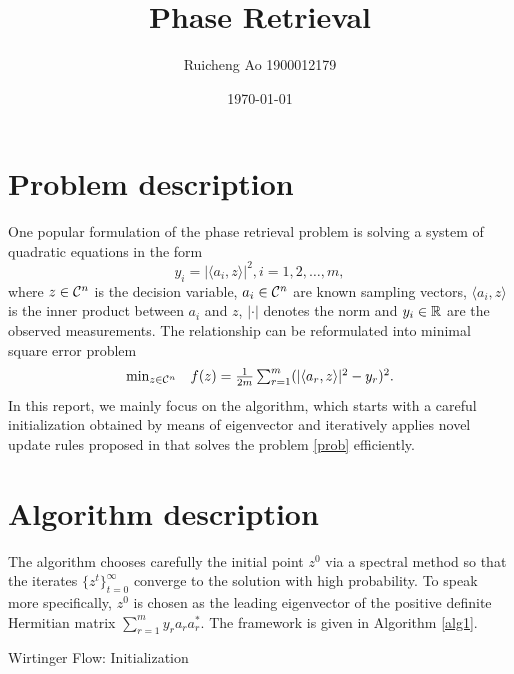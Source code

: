 \documentclass{article}
\title{Phase Retrieval}
\date{\today}
\author{Ruicheng Ao 1900012179}
\begin{document}
\maketitle
\section{Problem description}
One popular formulation of the phase retrieval problem is solving a system of quadratic equations in the form
\begin{equation}
	y_i = |\langle a_i,z\rangle|^2,i=1,2,\dots,m,
\end{equation}
where $z\in\mathcal C^n$ is the decision variable, $a_i\in\mathcal C^n$ are known sampling vectors, $\langle a_i,z\rangle$ is the inner product between $a_i$ and $z$, $|\cdot|$ denotes the norm and $y_i\in\mathbb R$ are the observed measurements. The relationship can be reformulated into minimal square error problem 
\begin{equation}\label{prob}
	\begin{array}{cc}
		\min_{z\in\mathcal C^n} & f(z)=\frac{1}{2m}\sum_{r=1}^m(|\langle a_r,z\rangle|^2-y_r)^2.
	\end{array}
\end{equation}
In this report, we mainly focus on the algorithm, which starts with a careful initialization obtained by means of eigenvector and iteratively applies novel update rules proposed in \cite{candes2015phase} that solves the problem \eqref{prob} efficiently.
\section{Algorithm description}
The algorithm chooses carefully the initial point $z^0$ via a spectral method so that the iterates $\{z^t\}_{t=0}^\infty$ converge to the solution with high probability. To speak more specifically, $z^0$ is chosen as the leading eigenvector of the positive definite Hermitian matrix $\sum_{r=1}^my_ra_ra_r^*$. The framework is given in Algorithm \ref{alg1}.
\begin{algorithm}[H]
	\caption{Wirtinger Flow: Initialization}
	\begin{algorithmic}[1]\label{alg1}
		\ENDFOR
	\end{algorithmic}
\end{algorithm}
\end{document}
